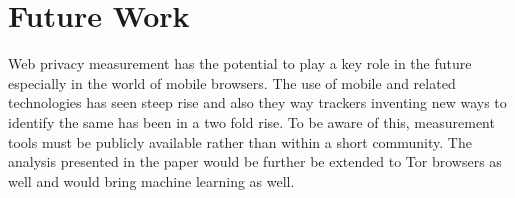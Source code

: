 \documentclass[journal]{IEEEtran}
\begin{document}
\section{Future Work}

Web privacy measurement has the potential to play a key role in the future especially in the world of mobile browsers. The use of mobile and related technologies has seen steep rise and also they way trackers inventing new ways to identify the same has been in a two fold rise. To be aware of this, measurement tools must be publicly available rather than within a short community. The analysis presented in the paper would be further be extended to Tor browsers as well and would bring machine learning as well.

%
%



%
%
\end{document}
